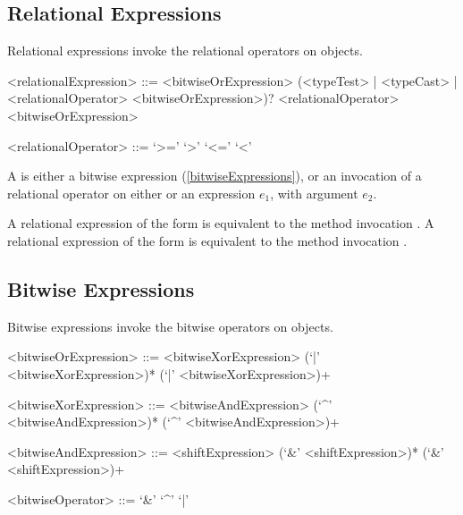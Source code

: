 \documentclass[makeidx]{article}
\begin{document}


\subsection{Relational Expressions}

\LMHash{}%
Relational expressions invoke the relational operators on objects.

\begin{grammar}
<relationalExpression> ::= <bitwiseOrExpression> \gnewline{}
  (<typeTest> | <typeCast> | <relationalOperator> <bitwiseOrExpression>)?
  \alt \SUPER{} <relationalOperator> <bitwiseOrExpression>

<relationalOperator> ::= `>='
  \alt `>'
  \alt `<='
  \alt `<'
\end{grammar}

\LMHash{}%
A  is either a bitwise expression
(\ref{bitwiseExpressions}),
or an invocation of a relational operator on either \SUPER{}
or an expression $e_1$, with argument $e_2$.

\LMHash{}%
A relational expression of the form 
is equivalent to the method invocation .
A relational expression of the form 
is equivalent to the method invocation .


\subsection{Bitwise Expressions}

\LMHash{}%
Bitwise expressions invoke the bitwise operators on objects.

\begin{grammar}
<bitwiseOrExpression> ::= \gnewline{}
  <bitwiseXorExpression> (`|' <bitwiseXorExpression>)*
  \alt \SUPER{} (`|' <bitwiseXorExpression>)+

<bitwiseXorExpression> ::= \gnewline{}
  <bitwiseAndExpression> (`^' <bitwiseAndExpression>)*
  \alt \SUPER{} (`^' <bitwiseAndExpression>)+

<bitwiseAndExpression> ::= <shiftExpression> (`\&' <shiftExpression>)*
  \alt \SUPER{} (`\&' <shiftExpression>)+

<bitwiseOperator> ::= `\&'
  \alt `^'
  \alt `|'
\end{grammar}
\end{document}
